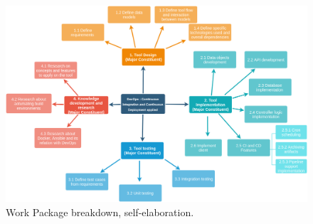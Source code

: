 \documentclass{article}
\begin{document}
\begin{figure}[h]
	\includegraphics[scale=0.4]{wp_breakdown}
	\caption{Work Package breakdown, self-elaboration.}
\end{figure}
~\\
\end{document}
